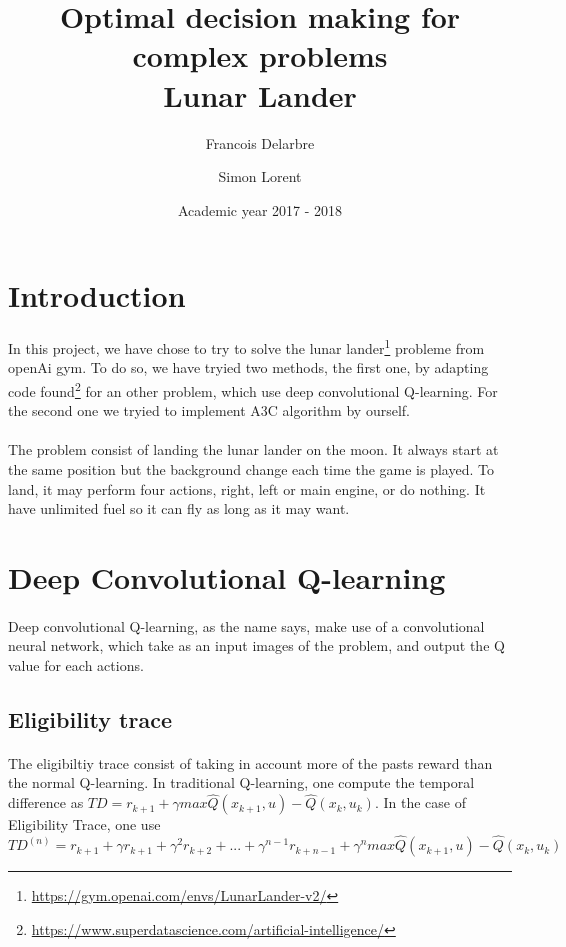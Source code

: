 \documentclass[14pt,a4paper,oneside]{report}
\title{\textbf{Optimal decision making for complex problems}
\\ Lunar Lander}
\author{Francois Delarbre \and Simon Lorent}
\begin{document}
\vfill
\date{Academic year 2017 - 2018}

\maketitle
\section{Introduction}
\paragraph{} In this project, we have chose to try to solve the lunar lander\footnote{\url{https://gym.openai.com/envs/LunarLander-v2/}} probleme from openAi gym. To do so, we have tryied two methods, the first one, by adapting code found\footnote{\url{https://www.superdatascience.com/artificial-intelligence/}} for an other problem, which use deep convolutional Q-learning. For the second one we tryied to implement A3C algorithm by ourself. 

\paragraph{} The problem consist of landing the lunar lander on the moon. It always start at the same position but the background change each time the game is played. To land, it may perform four actions, right, left or main engine, or do nothing. It have unlimited fuel so it can fly as long as it may want. 

\section{Deep Convolutional Q-learning}
\paragraph{} Deep convolutional Q-learning, as the name says, make use of a convolutional neural network, which take as an input images of the problem, and output the Q value for each actions. 
\subsection{Eligibility trace}
\paragraph{} The eligibiltiy trace consist of taking in account more of the pasts reward than the normal Q-learning. In traditional Q-learning, one compute the temporal difference as $TD = r_{k+1} + \gamma max\hat{Q}(x_{k+1}, u) − \hat{Q}(x_k, u_k)$. In the case of Eligibility Trace, one use $$TD^{(n)} = r_{k+1} + \gamma r_{k+1} + \gamma^2  r_{k+2} + ... + \gamma^{n-1}  r_{k+n-1} + \gamma^n max\hat{Q}(x_{k+1}, u) − \hat{Q}(x_k, u_k)$$
\end{document}
